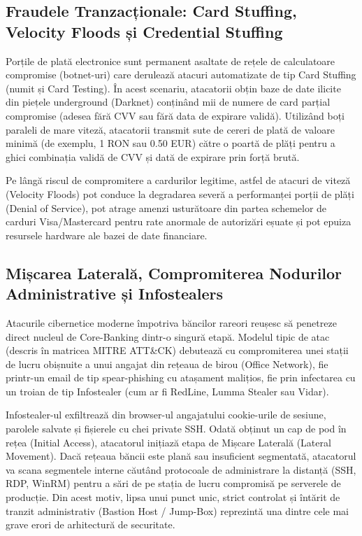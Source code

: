 \subsection{Fraudele Tranzacționale: Card Stuffing, Velocity Floods și Credential Stuffing}

Porțile de plată electronice sunt permanent asaltate de rețele de calculatoare compromise (botnet-uri) care derulează atacuri automatizate de tip Card Stuffing (numit și Card Testing). În acest scenariu, atacatorii obțin baze de date ilicite din piețele underground (Darknet) conținând mii de numere de card parțial compromise (adesea fără CVV sau fără data de expirare validă). Utilizând boți paraleli de mare viteză, atacatorii transmit sute de cereri de plată de valoare minimă (de exemplu, 1 RON sau 0.50 EUR) către o poartă de plăți pentru a ghici combinația validă de CVV și dată de expirare prin forță brută.

Pe lângă riscul de compromitere a cardurilor legitime, astfel de atacuri de viteză (Velocity Floods) pot conduce la degradarea severă a performanței porții de plăți (Denial of Service), pot atrage amenzi usturătoare din partea schemelor de carduri Visa/Mastercard pentru rate anormale de autorizări eșuate și pot epuiza resursele hardware ale bazei de date financiare.

\subsection{Mișcarea Laterală, Compromiterea Nodurilor Administrative și Infostealers}

Atacurile cibernetice moderne împotriva băncilor rareori reușesc să penetreze direct nucleul de Core-Banking dintr-o singură etapă. Modelul tipic de atac (descris în matricea MITRE ATT\&CK) debutează cu compromiterea unei stații de lucru obișnuite a unui angajat din rețeaua de birou (Office Network), fie printr-un email de tip spear-phishing cu atașament malițios, fie prin infectarea cu un troian de tip Infostealer (cum ar fi RedLine, Lumma Stealer sau Vidar).

Infostealer-ul exfiltrează din browser-ul angajatului cookie-urile de sesiune, parolele salvate și fișierele cu chei private SSH. Odată obținut un cap de pod în rețea (Initial Access), atacatorul inițiază etapa de Mișcare Laterală (Lateral Movement). Dacă rețeaua băncii este plană sau insuficient segmentată, atacatorul va scana segmentele interne căutând protocoale de administrare la distanță (SSH, RDP, WinRM) pentru a sări de pe stația de lucru compromisă pe serverele de producție. Din acest motiv, lipsa unui punct unic, strict controlat și întărit de tranzit administrativ (Bastion Host / Jump-Box) reprezintă una dintre cele mai grave erori de arhitectură de securitate.

